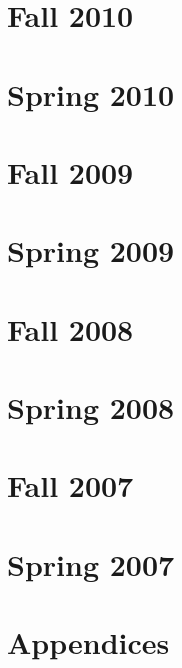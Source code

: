 \documentclass[12pt]{article}
\begin{document}
\section{Fall 2010}\label{f10}


\section{Spring 2010}\label{s10}


\section{Fall 2009}\label{f09}


\section{Spring 2009}\label{s09}


\section{Fall 2008}\label{f08}


\section{Spring 2008}\label{s08}


\section{Fall 2007}\label{f07}


\section{Spring 2007}\label{s07}


\newpage

\section{Appendices}



\end{document}
